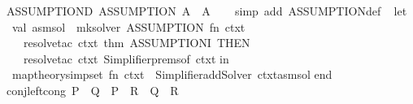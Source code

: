 \begin{isabellebody}
\isanewline
%
\endisadelimproof
\isanewline
{}\isamarkupfalse%
\ ASSUMPTION{\isacharunderscore}{\kern0pt}D{\isacharcolon}{\kern0pt}\ {\isachardoublequoteopen}ASSUMPTION\ A\ {\isasymLongrightarrow}\ A{\isachardoublequoteclose}\isanewline
%
\isadelimproof
\ \ %
\endisadelimproof
%
\isatagproof
{}\isamarkupfalse%
\ {\isacharparenleft}{\kern0pt}simp\ add{\isacharcolon}{\kern0pt}\ ASSUMPTION{\isacharunderscore}{\kern0pt}def{\isacharparenright}{\kern0pt}%
\endisatagproof
{\isafoldproof}%
%
\isadelimproof
\isanewline
%
\endisadelimproof
%
\isadelimML
\isanewline
%
\endisadelimML
%
\isatagML
{}\isamarkupfalse%
\ {\isacartoucheopen}\isanewline
let\isanewline
\ \ val\ asm{\isacharunderscore}{\kern0pt}sol\ {\isacharequal}{\kern0pt}\ mk{\isacharunderscore}{\kern0pt}solver\ {\isachardoublequote}{\kern0pt}ASSUMPTION{\isachardoublequote}{\kern0pt}\ {\isacharparenleft}{\kern0pt}fn\ ctxt\ {\isacharequal}{\kern0pt}{\isachargreater}{\kern0pt}\isanewline
\ \ \ \ resolve{\isacharunderscore}{\kern0pt}tac\ ctxt\ {\isacharbrackleft}{\kern0pt}{\isacharat}{\kern0pt}{\isacharbraceleft}{\kern0pt}thm\ ASSUMPTION{\isacharunderscore}{\kern0pt}I{\isacharbraceright}{\kern0pt}{\isacharbrackright}{\kern0pt}\ THEN{\isacharprime}{\kern0pt}\isanewline
\ \ \ \ resolve{\isacharunderscore}{\kern0pt}tac\ ctxt\ {\isacharparenleft}{\kern0pt}Simplifier{\isachardot}{\kern0pt}prems{\isacharunderscore}{\kern0pt}of\ ctxt{\isacharparenright}{\kern0pt}{\isacharparenright}{\kern0pt}\isanewline
in\isanewline
\ \ map{\isacharunderscore}{\kern0pt}theory{\isacharunderscore}{\kern0pt}simpset\ {\isacharparenleft}{\kern0pt}fn\ ctxt\ {\isacharequal}{\kern0pt}{\isachargreater}{\kern0pt}\ Simplifier{\isachardot}{\kern0pt}addSolver\ {\isacharparenleft}{\kern0pt}ctxt{\isacharcomma}{\kern0pt}asm{\isacharunderscore}{\kern0pt}sol{\isacharparenright}{\kern0pt}{\isacharparenright}{\kern0pt}\isanewline
end\isanewline
{\isacartoucheclose}%
\endisatagML
{\isafoldML}%
%
\isadelimML
%
\endisadelimML
%
\isadelimdocument
%
\endisadelimdocument
%
\isatagdocument
%
\isamarkuptrue%
%
\isamarkuptrue%
%
\endisatagdocument
{\isafolddocument}%
%
\isadelimdocument
%
\endisadelimdocument
{}\isamarkupfalse%
\ conj{\isacharunderscore}{\kern0pt}left{\isacharunderscore}{\kern0pt}cong{\isacharcolon}{\kern0pt}\ {\isachardoublequoteopen}P\ {\isasymlongleftrightarrow}\ Q\ {\isasymLongrightarrow}\ P\ {\isasymand}\ R\ {\isasymlongleftrightarrow}\ Q\ {\isasymand}\ R{\isachardoublequoteclose}\isanewline

\end{isabellebody}
